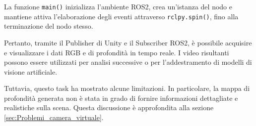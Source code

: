 \documentclass[11pt]{report}
\begin{document}
La funzione \texttt{main()} inizializza l'ambiente ROS2, crea un’istanza del nodo e mantiene attiva l’elaborazione degli eventi attraverso \texttt{rclpy.spin()}, fino alla terminazione del nodo stesso.

Pertanto, tramite il Publisher di Unity e il Subscriber ROS2, è possibile acquisire e visualizzare i dati RGB e di profondità in tempo reale. I video risultanti possono essere utilizzati per analisi successive o per l'addestramento di modelli di visione artificiale.


Tuttavia, questo task ha mostrato alcune limitazioni. In particolare, la mappa di profondità generata non è stata in grado di fornire informazioni dettagliate e realistiche sulla scena. Questa discussione è approfondita alla sezione \ref{sec:Problemi_camera_virtuale}.
\end{document}
